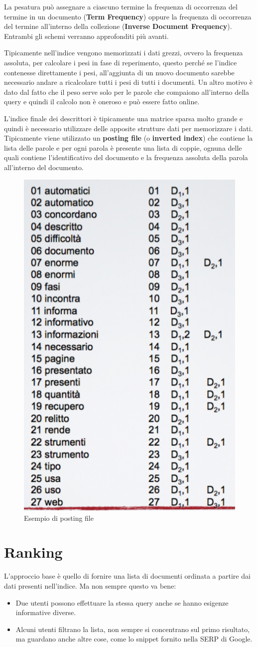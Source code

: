 La pesatura può assegnare a ciascuno termine la frequenza di occorrenza del termine in un documento (\textbf{Term Frequency}) oppure la frequenza di occorrenza del termine all'interno della collezione (\textbf{Inverse Document Frequency}). Entrambi gli schemi verranno approfonditi più avanti.

Tipicamente nell'indice vengono memorizzati i dati grezzi, ovvero la frequenza assoluta, per calcolare i pesi in fase di reperimento, questo perché se l'indice contenesse direttamente i pesi, all'aggiunta di un nuovo documento sarebbe necessario andare a ricalcolare tutti i pesi di tutti i documenti. Un altro motivo è dato dal fatto che il peso serve solo per le parole che compaiono all'interno della query e quindi il calcolo non è oneroso e può essere fatto online.

L'indice finale dei descrittori è tipicamente una matrice sparsa molto grande e quindi è necessario utilizzare delle apposite strutture dati per memorizzare i dati.
Tipicamente viene utilizzato un \textbf{posting file} (o \textbf{inverted index}) che contiene la lista delle parole e per ogni parola è presente una lista di coppie, ognuna delle quali contiene l'identificativo del documento e la frequenza assoluta della parola all'interno del documento.

\begin{figure}[htbp]
	\centering
	\includegraphics[width=0.3\linewidth]{images/l5-index-4}
	\caption{Esempio di posting file}
\end{figure}

\section{Ranking}

L'approccio base è quello di fornire una lista di documenti ordinata a partire dai dati presenti nell'indice.
Ma non sempre questo va bene:
\begin{itemize}
\item Due utenti possono effettuare la stessa query anche se hanno esigenze informative diverse.
\item Alcuni utenti filtrano la lista, non sempre si concentrano sul primo risultato, ma guardano anche altre cose, come lo snippet fornito nella SERP di Google.
\end{itemize}

